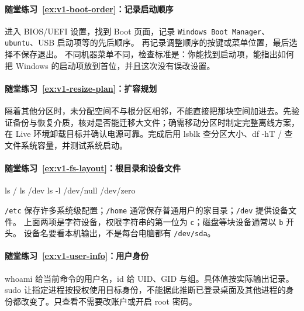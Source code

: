 \paragraph*{随堂练习~\ref{ex:v1-boot-order}：记录启动顺序}
\begin{solution}
进入 BIOS/UEFI 设置，找到 Boot 页面，记录 \texttt{Windows Boot Manager}、\texttt{ubuntu}、USB 启动项等的先后顺序。
再记录调整顺序的按键或菜单位置，最后选择不保存退出。
不同机器菜单不同，检查标准是：你能找到启动项，能指出如何把 Windows 的启动项放到首位，并且这次没有误改设置。
\end{solution}

\paragraph*{随堂练习~\ref{ex:v1-resize-plan}：扩容规划}
\begin{solution}
隔着其他分区时，未分配空间不与根分区相邻，不能直接把那块空间加进去。先验证备份与恢复介质，核对是否能迁移大文件；确需移动分区时制定完整离线方案，在 Live 环境卸载目标并确认电源可靠。完成后用 lsblk 查分区大小、df -hT / 查文件系统容量，并测试系统启动。
\end{solution}

\paragraph*{随堂练习~\ref{ex:v1-fs-layout}：根目录和设备文件}
\begin{solution}

\begin{tbash}
ls /
ls /dev
ls -l /dev/null /dev/zero
\end{tbash}

\texttt{/etc} 保存许多系统级配置；\texttt{/home} 通常保存普通用户的家目录；\texttt{/dev} 提供设备文件。
上面两项是字符设备，权限字符串的第一位为 \texttt{c}；磁盘等块设备通常以 \texttt{b} 开头。
设备名要看本机输出，不是每台电脑都有 \texttt{/dev/sda}。
\end{solution}

\paragraph*{随堂练习~\ref{ex:v1-user-info}：用户身份}
\begin{solution}
whoami 给当前命令的用户名，id 给 UID、GID 与组。具体值按实际输出记录。sudo 让指定进程按授权使用目标身份，不能据此推断已登录桌面及其他进程的身份都改变了。只查看不需要改账户或开启 root 密码。
\end{solution}
